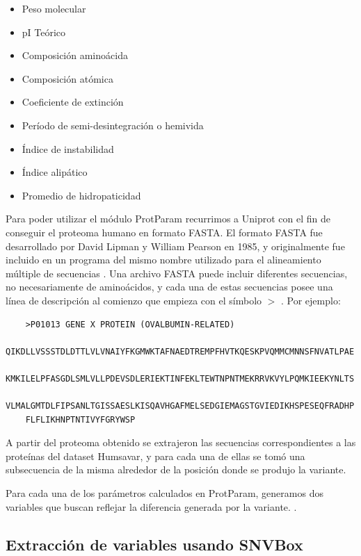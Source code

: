 \begin{itemize}
    \item Peso molecular
    \item pI Teórico
    \item Composición aminoácida
    \item Composición atómica
    \item Coeficiente de extinción
    \item Período de semi-desintegración o hemivida
    \item Índice de instabilidad
    \item Índice alipático
    \item Promedio de hidropaticidad
\end{itemize}

Para poder utilizar el módulo ProtParam recurrimos a Uniprot con el fin de conseguir el proteoma humano en formato FASTA. El formato FASTA fue desarrollado por David Lipman y William Pearson en 1985, y originalmente fue incluido en un programa del mismo nombre utilizado para el alineamiento múltiple de secuencias \todo{[ref]}. Una archivo FASTA puede incluir diferentes secuencias, no necesariamente de aminoácidos, y cada una de estas secuencias posee una línea de descripción al comienzo que empieza con el símbolo $>$ \todo{[ref]}. Por ejemplo:

\begin{verbatim}
	>P01013 GENE X PROTEIN (OVALBUMIN-RELATED)
	QIKDLLVSSSTDLDTTLVLVNAIYFKGMWKTAFNAEDTREMPFHVTKQESKPVQMMCMNNSFNVATLPAE
	KMKILELPFASGDLSMLVLLPDEVSDLERIEKTINFEKLTEWTNPNTMEKRRVKVYLPQMKIEEKYNLTS
	VLMALGMTDLFIPSANLTGISSAESLKISQAVHGAFMELSEDGIEMAGSTGVIEDIKHSPESEQFRADHP
	FLFLIKHNPTNTIVYFGRYWSP
\end{verbatim}


A partir del proteoma obtenido \todo{[ref]} se extrajeron las secuencias correspondientes a las proteínas del dataset Humsavar, y para cada una de ellas se tomó una subsecuencia de la misma alrededor de la posición donde se produjo la variante.

\vspace{2mm}
\vspace{2mm}

Para cada una de los parámetros calculados en ProtParam, generamos dos variables que buscan reflejar la diferencia generada por la variante. .

\subsection{Extracción de variables usando SNVBox}

